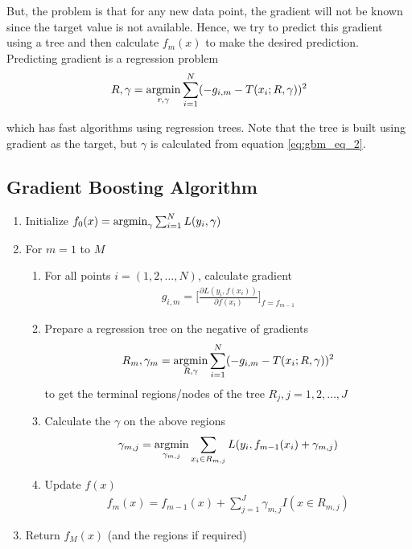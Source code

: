 \documentclass[../statistical_learning_notes.tex]{subfiles}
\begin{document}
But, the problem is that for any new data point, the gradient will not be known since the target value is not available. Hence, we try to predict this gradient using a tree and then calculate $f_{m}(x)$ to make the desired prediction. Predicting gradient is a regression problem
\begin{align*}
    R, \gamma = \operatorname*{argmin}_{r, \gamma} \sum_{i=1}^{N} (-g_{i,m} - T(x_{i}; R, \gamma))^{2}
\end{align*}

which has fast algorithms using regression trees. Note that the tree is built using gradient as the target, but $\gamma$ is calculated from equation \eqref{eq:gbm_eq_2}.


\subsection{Gradient Boosting Algorithm}
\begin{enumerate}
    \item Initialize $f_{0}(x) = \operatorname*{argmin}_{\gamma} \sum_{i=1}^{N} L(y_{i}, \gamma)$
    \item For $m=1$ to $M$
    \begin{enumerate}
        \item For all points $i = (1, 2, \ldots, N)$, calculate gradient
        \begin{align*}
            g_{i, m} = \bigg[ \frac{\partial L(y_{i}, f(x_{i}))}{\partial f(x_{i})} \bigg]_{f=f_{m-1}}
        \end{align*}
        \item Prepare a regression tree on the negative of gradients
        \begin{align*}
            R_{m}, \gamma_{m} = \operatorname*{argmin}_{R, \gamma} \sum_{i=1}^{N} (-g_{i,m} - T(x_{i}; R, \gamma))^{2}
        \end{align*}
        to get the terminal regions/nodes of the tree $R_{j}, j=1,2,\ldots,J$
        \item Calculate the $\gamma$ on the above regions
        \begin{align*}
            \gamma_{m,j} = \operatorname*{argmin}_{\gamma_{m,j}} \sum_{x_{i} \in R_{m,j}} L(y_{i}, f_{m-1}(x_{i}) + \gamma_{m,j})
        \end{align*}
        \item Update $f(x)$
        \begin{align*}
            f_{m}(x) = f_{m-1}(x) + \sum_{j=1}^{J} \gamma_{m,j} I(x \in R_{m,j})
        \end{align*}
    \end{enumerate}
    \item Return $f_{M}(x)$ (and the regions if required)
\end{enumerate}
\end{document}
